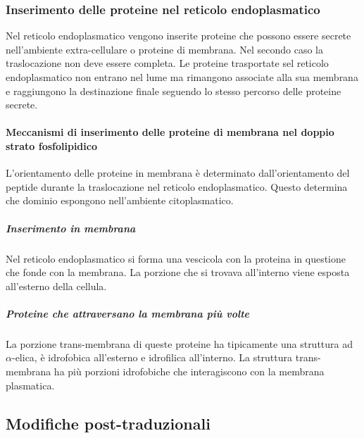 		\subsubsection{Inserimento delle proteine nel reticolo endoplasmatico}
		Nel reticolo endoplasmatico vengono inserite proteine che possono essere secrete nell'ambiente extra-cellulare o proteine di membrana.
		Nel secondo caso la traslocazione non deve essere completa.
		Le proteine trasportate sel reticolo endoplasmatico non entrano nel lume ma rimangono associate alla sua membrana e raggiungono la destinazione finale seguendo lo stesso percorso delle proteine secrete.

			\paragraph{Meccanismi di inserimento delle proteine di membrana nel doppio strato fosfolipidico}
			L'orientamento delle proteine in membrana \`e determinato dall'orientamento del peptide durante la traslocazione nel reticolo endoplasmatico.
			Questo determina che dominio espongono nell'ambiente citoplasmatico.

				\subparagraph{Inserimento in membrana}
				Nel reticolo endoplasmatico si forma una vescicola con la proteina in questione che fonde con la membrana.
				La porzione che si trovava all'interno viene esposta all'esterno della cellula.

				\subparagraph{Proteine che attraversano la membrana pi\`u volte}
				La porzione trans-membrana di queste proteine ha tipicamente una struttura ad $\alpha$-elica, \`e idrofobica all'esterno e idrofilica all'interno.
			La struttura trans-membrana ha pi\`u porzioni idrofobiche che interagiscono con la membrana plasmatica.

	\subsection{Modifiche post-traduzionali}

